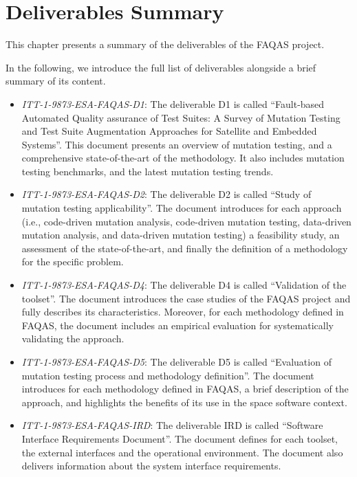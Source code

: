 
\chapter{Deliverables Summary}

This chapter presents a summary of the deliverables of the FAQAS project. 

In the following, we introduce the full list of deliverables alongside a brief summary of its content.

\begin{itemize}
	\item \emph{ITT-1-9873-ESA-FAQAS-D1}: The deliverable D1 is called ``Fault-based Automated Quality assurance of Test Suites: A Survey of Mutation Testing and Test Suite Augmentation Approaches for Satellite and Embedded Systems''. This document presents an overview of mutation testing, and a comprehensive state-of-the-art of the methodology. It also includes mutation testing benchmarks, and the latest mutation testing trends.

	\item \emph{ITT-1-9873-ESA-FAQAS-D2}: The deliverable D2 is called ``Study of mutation testing applicability''. The document introduces for each approach (i.e., code-driven mutation analysis, code-driven mutation testing, data-driven mutation analysis, and data-driven mutation testing) a feasibility study, an assessment of the state-of-the-art, and finally the definition of a methodology for the specific problem. 

	\item \emph{ITT-1-9873-ESA-FAQAS-D4}: The deliverable D4 is called ``Validation of the toolset''. The document introduces the case studies of the FAQAS project and fully describes its characteristics. Moreover, for each methodology defined in FAQAS, the document includes an empirical evaluation for systematically validating the approach. 

	\item \emph{ITT-1-9873-ESA-FAQAS-D5}: The deliverable D5 is called ``Evaluation of mutation testing process and methodology definition''. The document introduces for each methodology defined in FAQAS, a brief description of the approach, and highlights the benefits of its use in the space software context. 

	\item \emph{ITT-1-9873-ESA-FAQAS-IRD}: The deliverable IRD is called ``Software Interface Requirements Document''. The document defines for each toolset, the external interfaces and the operational environment. The document also delivers information about the system interface requirements. 


\end{itemize}
